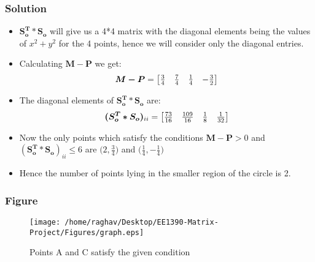 \documentclass[xcolor=dvipsnames]{beamer}
\begin{document}
\begin{frame}
\frametitle{Solution}
\begin{itemize}
 \item<1-> $\boldsymbol{S_o^{T}}*\boldsymbol{S_o}$ will give us a 4*4 matrix with the diagonal elements being the values of $x^{2} + y^{2}$ for the 4 points, hence we will consider only the diagonal entries. 
 \item<2-> Calculating $\boldsymbol{M}-\boldsymbol{P}$ we get:
 \[
 \boldsymbol{M-P} =
\begin{bmatrix}
    $\(\frac{3}{4}\)$ & $\(\frac{7}{4}\)$ & $\(\frac{1}{4}\)$ & $\(-\frac{3}{2}\)$
\end{bmatrix}
\] 
 \item<3-> The diagonal elements of $\boldsymbol{S_o^{T}*S_o}$ are:
  \[
 \boldsymbol{(S_o^{T}*S_o)}_{ii} =
\begin{bmatrix}
    $\(\frac{73}{16}\)$ & $\(\frac{109}{16}\)$ & $\(\frac{1}{8}\)$ & $\(\frac{1}{32}\)$
\end{bmatrix}
\] 
\item<4-> Now the only points which satisfy the conditions $\boldsymbol{M-P} > 0$ and $\boldsymbol{(S_o^{T}*S_o)}_{ii}\leqslant 6$ are $\bigg(2,$\(\frac{3}{4}\)$\bigg)$ and $\bigg($\(\frac{1}{4}\)$,$\(-\frac{1}{4}\)$\bigg)$
\item<5->Hence the number of points lying in the smaller region of the circle is 2.
\end{itemize}

\end{frame}

\begin{frame}
\frametitle{Figure}
\begin{figure}[h]
\centering
\texttt{[image: /home/raghav/Desktop/EE1390-Matrix-Project/Figures/graph.eps]}
\caption{Points A and C satisfy the given condition}
\label{foobar-figure}
\end{figure}

\end{frame}
\end{document}
